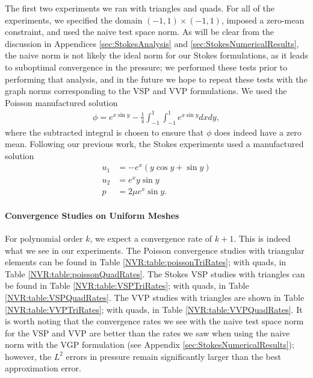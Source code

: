 The first two experiments we ran with triangles and quads.  For all of the experiments, we specified the domain $(-1,1) \times (-1,1)$, imposed a zero-mean constraint, and used the naive test space norm.  As will be clear from the discussion in Appendices \ref{sec:StokesAnalysis} and \ref{sec:StokesNumericalResults}, the naive norm is not likely the ideal norm for our Stokes formulations, as it leads to suboptimal convergence in the pressure; we performed these tests prior to performing that analysis, and in the future we hope to repeat these tests with the graph norms corresponding to the VSP and VVP formulations.  We used the Poisson manufactured solution
\begin{align*}
\phi = e^{x \sin y} - \frac{1}{4} \int_{-1}^{1} \int_{-1}^{1} e^{x \sin y} dx dy,
\end{align*}
where the subtracted integral is chosen to ensure that $\phi$ does indeed have a zero mean.  Following our previous work, the Stokes experiments used a manufactured solution
\begin{align*}
u_{1} &=  -e^{x} ( y \cos y + \sin y )\\
u_{2} &=  e^{x}  y \sin y\\
p &= 2 \mu e^{x} \sin y.
\end{align*}

\paragraph{Convergence Studies on Uniform Meshes}
For polynomial order $k$, we expect a convergence rate of $k+1$.  This is indeed what we see in our experiments.  The Poisson convergence studies with triangular elements can be found in Table \ref{NVR:table:poissonTriRates}; with quads, in Table \ref{NVR:table:poissonQuadRates}.  The Stokes VSP studies with triangles can be found in Table \ref{NVR:table:VSPTriRates}; with quads, in Table \ref{NVR:table:VSPQuadRates}.  The VVP studies with triangles are shown in Table \ref{NVR:table:VVPTriRates}; with quads, in Table \ref{NVR:table:VVPQuadRates}.  It is worth noting that the convergence rates we see with the naive test space norm for the VSP and VVP are better than the rates we saw when using the naive norm with the VGP formulation (see Appendix \ref{sec:StokesNumericalResults}); however, the $L^{2}$ errors in pressure remain significantly larger than the best approximation error.

